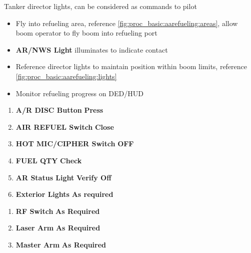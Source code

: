 \begin{checklistenumerate}
{
        \caption{Tanker director lights, can be considered as commands to pilot}
        \label{fig:proc_basic:aarefueling:lights}
    }
    \begin{itemize}
        \item Fly into refueling area, reference \cref{fig:proc_basic:aarefueling:areas}, allow boom operator to fly boom into refueling port
        \item \textbf{AR/NWS Light} illuminates to indicate contact
        \item Reference director lights to maintain position within boom limits, reference \cref{fig:proc_basic:aarefueling:lights}
        \item Monitor refueling progress on DED/HUD
    \end{itemize}
    \begin{enumerate}
        \item \textbf{A/R DISC Button} \dotfill \textbf{Press}
        \item \textbf{AIR REFUEL Switch} \dotfill \textbf{Close}\cbend
        \item \textbf{HOT MIC/CIPHER Switch} \dotfill \textbf{OFF}
        \item \textbf{FUEL QTY} \dotfill \textbf{Check}
        \item \textbf{AR Status Light} \dotfill \textbf{Verify Off}
        \item \textbf{Exterior Lights} \dotfill \textbf{As required}
    \end{enumerate}
    \begin{enumerate}
        \item \textbf{RF Switch} \dotfill \textbf{As Required}
        \item \textbf{Laser Arm} \dotfill \textbf{As Required}
        \item \textbf{Master Arm} \dotfill \textbf{As Required}
    \end{enumerate}
\end{checklistenumerate}

\marginfigrestore